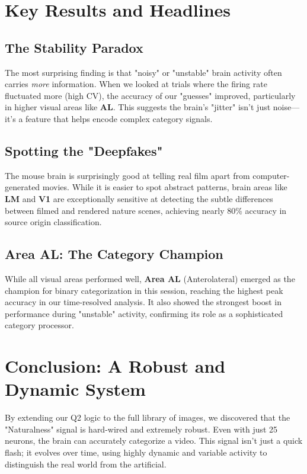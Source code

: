 \documentclass[11pt]{article}
\begin{document}
\section{Key Results and Headlines}

\subsection{The Stability Paradox}
The most surprising finding is that "noisy" or "unstable" brain activity often carries \textit{more} information. When we looked at trials where the firing rate fluctuated more (high CV), the accuracy of our "guesses" improved, particularly in higher visual areas like \textbf{AL}. This suggests the brain's "jitter" isn't just noise—it's a feature that helps encode complex category signals.

\subsection{Spotting the "Deepfakes"}
The mouse brain is surprisingly good at telling real film apart from computer-generated movies. While it is easier to spot abstract patterns, brain areas like \textbf{LM} and \textbf{V1} are exceptionally sensitive at detecting the subtle differences between filmed and rendered nature scenes, achieving nearly 80\% accuracy in source origin classification.

\subsection{Area AL: The Category Champion}
While all visual areas performed well, \textbf{Area AL} (Anterolateral) emerged as the champion for binary categorization in this session, reaching the highest peak accuracy in our time-resolved analysis. It also showed the strongest boost in performance during "unstable" activity, confirming its role as a sophisticated category processor.

\section{Conclusion: A Robust and Dynamic System}
By extending our Q2 logic to the full library of images, we discovered that the "Naturalness" signal is hard-wired and extremely robust. Even with just 25 neurons, the brain can accurately categorize a video. This signal isn't just a quick flash; it evolves over time, using highly dynamic and variable activity to distinguish the real world from the artificial.
\end{document}
